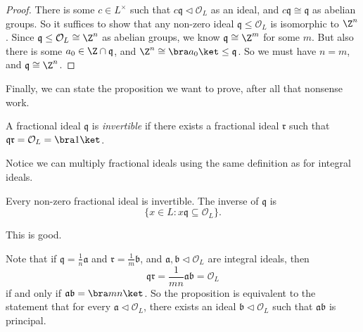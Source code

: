 \documentclass[a4paper]{article}
\begin{document}
\begin{proof}
  There is some $c \in L^\times$ such that $c\mathfrak{q} \lhd \mathcal{O}_L$ as an ideal, and $c\mathfrak{q} \cong \mathfrak{q}$ as abelian groups. So it suffices to show that any non-zero ideal $\mathfrak{q} \leq \mathcal{O}_L$ is isomorphic to $\Z^n$. Since $\mathfrak{q} \leq \mathcal{O}_L \cong \Z^n$ as abelian groups, we know $\mathfrak{q} \cong \Z^m$ for some $m$. But also there is some $a_0 \in \Z \cap \mathfrak{q}$, and $\Z^n \cong \bra a_0\ket \leq \mathfrak{q}$. So we must have $n = m$, and $\mathfrak{q} \cong \Z^n$.
\end{proof}

Finally, we can state the proposition we want to prove, after all that nonsense work.

\begin{defi}
  A fractional ideal $\mathfrak{q}$ is \emph{invertible} if there exists a fractional ideal $\mathfrak{r}$ such that $\mathfrak{q}\mathfrak{r} = \mathcal{O}_L = \bra 1\ket$.
\end{defi}
Notice we can multiply fractional ideals using the same definition as for integral ideals.

\begin{prop}
  Every non-zero fractional ideal is invertible. The inverse of $\mathfrak{q}$ is
  \[
    \{x \in L: x\mathfrak{q} \subseteq \mathcal{O}_L\}.
  \]
\end{prop}
This is good.

Note that if $\mathfrak{q} = \frac{1}{n} \mathfrak{a}$ and $\mathfrak{r} = \frac{1}{m} \mathfrak{b}$, and $\mathfrak{a}, \mathfrak{b} \lhd \mathcal{O}_L$ are integral ideals, then
\[
  \mathfrak{q} \mathfrak{r} = \frac{1}{mn} \mathfrak{a}\mathfrak{b} = \mathcal{O}_L
\]
if and only if $\mathfrak{a}\mathfrak{b} = \bra mn\ket$. So the proposition is equivalent to the statement that for every $\mathfrak{a} \lhd \mathcal{O}_L$, there exists an ideal $\mathfrak{b} \lhd \mathcal{O}_L$ such that $\mathfrak{a}\mathfrak{b}$ is principal.
\end{document}
